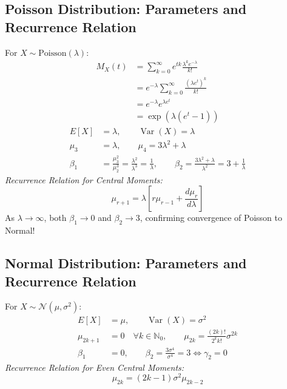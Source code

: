 \documentclass[12pt,a4paper]{article}
\begin{document}
\subsection{Poisson Distribution: Parameters and Recurrence Relation}
For $X \sim \text{Poisson}(\lambda)$:
\begin{equation}
  \begin{aligned}
    M_X(t) &= \sum_{k=0}^\infty e^{tk} \frac{\lambda^k e^{-\lambda}}{k!} \\[3pt]
    &= e^{-\lambda} \sum_{k=0}^\infty \frac{(\lambda e^t)^k}{k!} \\[3pt]
    &= e^{-\lambda} e^{\lambda e^t} \\[3pt]
    &= \exp\left(\lambda(e^t - 1)\right)
  \end{aligned}
\end{equation}
\begin{align}
  E[X] &= \lambda, \qquad \operatorname{Var}(X) = \lambda \\[3pt]
  \mu_3 &= \lambda, \qquad \mu_4 = 3\lambda^2 + \lambda \\[3pt]
  \beta_1 &= \frac{\mu_3^2}{\mu_2^3} = \frac{\lambda^2}{\lambda^3} = \frac{1}{\lambda}, \qquad \beta_2 = \frac{3\lambda^2 + \lambda}{\lambda^2} = 3 + \frac{1}{\lambda}
\end{align}
\textit{Recurrence Relation for Central Moments:}
\begin{equation}
  \mu_{r+1} = \lambda \left[r \mu_{r-1} + \frac{d\mu_r}{d\lambda}\right]
\end{equation}
As $\lambda \to \infty$, both $\beta_1 \to 0$ and $\beta_2 \to 3$, confirming convergence of Poisson to Normal!

\subsection{Normal Distribution: Parameters and Recurrence Relation}
For $X \sim \mathcal{N}(\mu, \sigma^2)$:
\begin{align}
  E[X] &= \mu, \qquad \operatorname{Var}(X) = \sigma^2 \\[3pt]
  \mu_{2k+1} &= 0 \quad \forall k \in \mathbb{N}_0, \qquad \mu_{2k} = \frac{(2k)!}{2^k k!} \sigma^{2k} \\[3pt]
  \beta_1 &= 0, \qquad \beta_2 = \frac{3\sigma^4}{\sigma^4} = 3 \iff \gamma_2 = 0
\end{align}
\textit{Recurrence Relation for Even Central Moments:}
\begin{equation}
  \mu_{2k} = (2k - 1) \sigma^2 \mu_{2k-2}
\end{equation}
\end{document}

